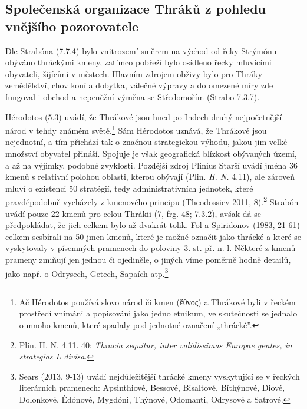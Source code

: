 \subsection[společenská-organizace-thráků-z-pohledu-vnějšího-pozorovatele]{Společenská organizace Thráků z pohledu vnějšího pozorovatele}

Dle Strabóna (7.7.4) bylo vnitrozemí směrem na východ od řeky Strýmónu obýváno thráckými kmeny, zatímco pobřeží bylo osídleno řecky mluvícími obyvateli, žijícími v městech. Hlavním zdrojem obživy bylo pro Thráky zemědělství, chov koní a dobytka, válečné výpravy a do omezené míry zde fungoval i obchod a nepeněžní výměna se Středomořím (Strabo 7.3.7).

Hérodotos (5.3) uvádí, že Thrákové jsou hned po Indech druhý nejpočetnější národ v tehdy známém světě.\footnote{Ač Hérodotos používá slovo národ či kmen (ἔθνος) a Thrákové byli v řeckém prostředí vnímáni a popisováni jako jedno etnikum, ve skutečnosti se jednalo o mnoho kmenů, které spadaly pod jednotné označení „thrácké”.} Sám Hérodotos uznává, že Thrákové jsou nejednotní, a tím přichází tak o značnou strategickou výhodu, jakou jim velké množství obyvatel přináší. Spojuje je však geografická blízkost obývaných území, a až na výjimky, podobné zvyklosti. Pozdější zdroj Plinius Starší uvádí jména 36 kmenů s relativní polohou oblasti, kterou obývají (Plin. {\em H. N.} 4.11), ale zároveň mluví o existenci 50 stratégií, tedy administrativních jednotek, které pravděpodobně vycházely z kmenového principu (Theodossiev 2011, 8).\footnote{Plin. H. N. 4.11. 40: {\em Thracia sequitur, inter validissimas Europae gentes, in strategias L divisa}.} Strabón uvádí pouze 22 kmenů pro celou Thrákii (7, frg. 48; 7.3.2), avšak dá se předpokládat, že jich celkem bylo až dvakrát tolik. Fol a Spiridonov (1983, 21-61) celkem sesbírali na 50 jmen kmenů, které je možné označit jako thrácké a které se vyskytovaly v písemných pramenech do poloviny 3. st. př. n. l. Některé z kmenů prameny zmiňují jen jednou či ojediněle, o jiných víme poměrně hodně detailů, jako např. o Odrysech, Getech, Sapaích atp.\footnote{Sears (2013, 9-13) uvádí nejdůležitější thrácké kmeny vyskytující se v řeckých literárních pramenech: Apsinthiové, Bessové, Bisaltové, Bíthýnové, Diové, Dolonkové, Édónové, Mygdóni, Thýnové, Odomanti, Odrysové a Satrové.}

